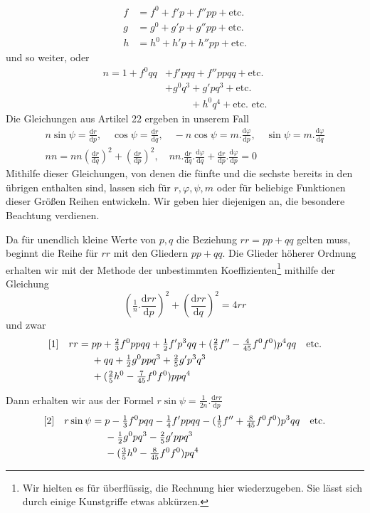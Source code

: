 %
\[
\begin{aligned}
f&=f^0+f'p+f''pp+\text{etc.}\\
g&=g^0+g'p+g''pp+\text{etc.}\\
h&=h^0+h'p+h''pp+\text{etc.}
\end{aligned}
\]
und so weiter, oder
\[
\begin{aligned}
n=1+f^0qq&+f'pqq+f''ppqq+\text{etc.}\\
&+g^0q^3+g'pq^3+\text{etc.}\\
&\phantom{+g^0q^3}+h^0q^4+\text{etc. etc.}
\end{aligned}
\]
Die Gleichungen aus Artikel 22 ergeben in unserem Fall
\[
\begin{gathered}
n\sin\psi=\frac{\mathrm{d}r}{\mathrm{d}p},\quad\cos\psi=\frac{\mathrm{d}r}{\mathrm{d}q},\quad-n\cos\psi=m\mathord{.}\frac{\mathrm{d}\varphi}{\mathrm{d}p},\quad\sin\psi=m\mathord{.}\frac{\mathrm{d}\varphi}{\mathrm{d}q}\\
nn=nn(\frac{\mathrm{d}r}{\mathrm{d}q})^2+(\frac{\mathrm{d}r}{\mathrm{d}p})^2,\quad nn\mathord{.}\frac{\mathrm{d}r}{\mathrm{d}q}\mathord{.}\frac{\mathrm{d}\varphi}{\mathrm{d}q}+\frac{\mathrm{d}r}{\mathrm{d}p}\mathord{.}\frac{\mathrm{d}\varphi}{\mathrm{d}p}=0
\end{gathered}
\]
Mithilfe dieser Gleichungen, von denen die fünfte und die sechste bereits in den übrigen enthalten sind, lassen sich für \(r,\varphi,\psi,m\) oder für beliebige Funktionen dieser Größen Reihen entwickeln. Wir geben hier diejenigen an, die besondere Beachtung verdienen.

Da für unendlich kleine Werte von \(p,q\) die Beziehung \(rr=pp+qq\) gelten muss, beginnt die Reihe für \(rr\) mit den Gliedern \(pp+qq\). Die Glieder höherer Ordnung erhalten wir mit der Methode der unbestimmten Koeffizienten\footnote{Wir hielten es für überflüssig, die Rechnung hier wiederzugeben. Sie lässt sich durch einige Kunstgriffe etwas abkürzen.} mithilfe der Gleichung
\[
(\tfrac{1}{n}\mathord{.}\frac{\mathrm{d}rr}{\mathrm{d}p})^2+(\frac{\mathrm{d}rr}{\mathrm{d}q})^2=4rr
\]
und zwar
\[
\begin{aligned}
\relax[1]\quad rr={}&pp+\tfrac{2}{3}f^0ppqq+\tfrac{1}{2}f'p^3qq+(\tfrac{2}{5}f''-\tfrac{4}{45}f^0f^0)p^4qq\quad\text{etc.}\\
&+qq+\tfrac{1}{2}g^0ppq^3+\tfrac{2}{5}g'p^3q^3\\
&+(\tfrac{2}{5}h^0-\tfrac{7}{45}f^0f^0)ppq^4
\end{aligned}
\]

Dann erhalten wir aus der Formel \(r\sin\psi=\frac{1}{2n}\mathord{.}\frac{\mathrm{d}rr}{\mathrm{d}p}\)
\[
\begin{aligned}
\relax[2]\quad r\sin\psi={}&p-\tfrac{1}{3}f^0pqq-\tfrac{1}{4}f'ppqq-(\tfrac{1}{5}f''+\tfrac{8}{45}f^0f^0)p^3qq\quad\text{etc.}\\
&-\tfrac{1}{2}g^0pq^3-\tfrac{2}{5}g'ppq^3\\
&-(\tfrac{3}{5}h^0-\tfrac{8}{45}f^0f^0)pq^4
\end{aligned}
\]
